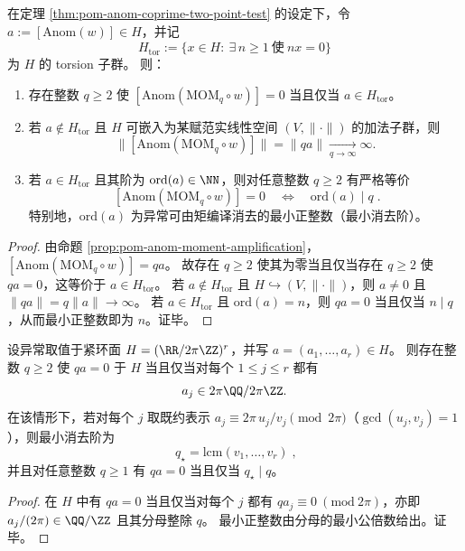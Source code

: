\begin{theorem}\label{thm:pom-anom-torsion-eliminability-min-order}
在定理 \ref{thm:pom-anom-coprime-two-point-test} 的设定下，令 \(a:=[\mathrm{Anom}(w)]\in H\)，并记
\[
H_{\mathrm{tor}}:=\{x\in H:\ \exists\,n\ge 1\ \text{使}\ nx=0\}
\]
为 \(H\) 的 torsion 子群。
则：
\begin{enumerate}
  \item 存在整数 \(q\ge 2\) 使 \([\mathrm{Anom}(\mathrm{MOM}_q\circ w)]=0\) 当且仅当 \(a\in H_{\mathrm{tor}}\)。
  \item 若 \(a\notin H_{\mathrm{tor}}\) 且 \(H\) 可嵌入为某赋范实线性空间 \((V,\|\cdot\|)\) 的加法子群，则
  \[
  \bigl\|[\mathrm{Anom}(\mathrm{MOM}_q\circ w)]\bigr\|
  =\|qa\|\xrightarrow[q\to\infty]{}\infty.
  \]
  \item 若 \(a\in H_{\mathrm{tor}}\) 且其阶为 \(\mathrm{ord}(a)\in\NN\)，则对任意整数 \(q\ge 2\) 有严格等价
  \[
  \boxed{\;
  [\mathrm{Anom}(\mathrm{MOM}_q\circ w)]=0\quad\Longleftrightarrow\quad \mathrm{ord}(a)\mid q\; }.
  \]
  特别地，\(\mathrm{ord}(a)\) 为异常可由矩编译消去的最小正整数（最小消去阶）。
\end{enumerate}
\end{theorem}
\begin{proof}
由命题 \ref{prop:pom-anom-moment-amplification}，
\(
[\mathrm{Anom}(\mathrm{MOM}_q\circ w)]=qa
\)。
故存在 \(q\ge 2\) 使其为零当且仅当存在 \(q\ge 2\) 使 \(qa=0\)，这等价于 \(a\in H_{\mathrm{tor}}\)。
若 \(a\notin H_{\mathrm{tor}}\) 且 \(H\hookrightarrow (V,\|\cdot\|)\)，则 \(a\neq 0\) 且 \(\|qa\|=q\|a\|\to\infty\)。
若 \(a\in H_{\mathrm{tor}}\) 且 \(\mathrm{ord}(a)=n\)，则 \(qa=0\) 当且仅当 \(n\mid q\)，从而最小正整数即为 \(n\)。证毕。
\end{proof}

\begin{corollary}[环面型相位异常的有限覆盖消去与分母最小公倍数律]\label{cor:pom-anom-torus-phase-elimination}
设异常取值于紧环面
\(
H=(\RR/2\pi\ZZ)^r
\)，并写 \(a=(a_1,\dots,a_r)\in H\)。
则存在整数 \(q\ge 2\) 使 \(qa=0\) 于 \(H\) 当且仅当对每个 \(1\le j\le r\) 都有
\[
a_j\in 2\pi\QQ/2\pi\ZZ.
\]
在该情形下，若对每个 \(j\) 取既约表示
\(
a_j\equiv 2\pi\,u_j/v_j\pmod{2\pi}
\)（\(\gcd(u_j,v_j)=1\)），则最小消去阶为
\[
\boxed{\;
q_\star=\mathrm{lcm}(v_1,\dots,v_r)\; },
\]
并且对任意整数 \(q\ge 1\) 有 \(qa=0\) 当且仅当 \(q_\star\mid q\)。
\end{corollary}
\begin{proof}
在 \(H\) 中有 \(qa=0\) 当且仅当对每个 \(j\) 都有 \(q a_j\equiv 0\ (\mathrm{mod}\ 2\pi)\)，亦即 \(a_j/(2\pi)\in \QQ/\ZZ\) 且其分母整除 \(q\)。
最小正整数由分母的最小公倍数给出。证毕。
\end{proof}

